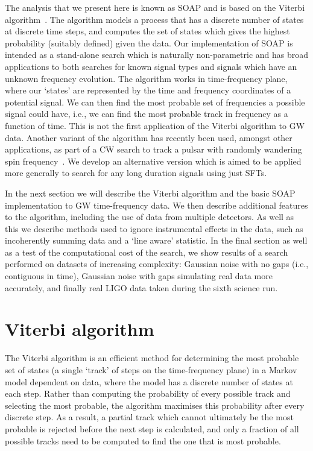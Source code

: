%
%
The analysis that we present here is known as SOAP \citep{ellis2006SnakesPlanea} and is based on the Viterbi algorithm~\citep{viterbi1967ErrorBounds}. The algorithm models a process that has a discrete number of states at discrete time steps, and computes the set of states which gives the highest probability (suitably defined) given the data. Our implementation of SOAP is intended as a stand-alone search which is naturally non-parametric and has broad applications to both searches for known signal types and signals which have an unknown frequency evolution. The algorithm works in time-frequency plane, where our `states' are represented by the time and frequency coordinates of a potential signal. We can then find the most probable set of frequencies a possible signal could have, i.e., we can find the most probable track in frequency as a function of time. This is not the first application of the Viterbi algorithm to \gls{GW} data. Another variant of the algorithm \citep{suvorova2016HiddenMarkova} has recently been used, amongst other applications, as part of a \gls{CW} search to track a pulsar with randomly wandering spin frequency~\citep{sun2018HiddenMarkov, suvorova2017HiddenMarkov,abbott2017SearchGravitational, abbott2018SearchGravitational, sun2018ApplicationHidden}. We develop an alternative version which is aimed to be applied more generally to search for any long duration signals using just \glspl{SFT}.

%
%
In the next section we will describe the Viterbi algorithm and the basic SOAP implementation to \gls{GW} time-frequency data. We then describe additional features to the algorithm, including the use of data from multiple detectors. As well as this we describe methods used to ignore instrumental effects in the data, such as incoherently summing data and a `line aware' statistic. In the final section as well as a test of the computational cost of the search, we show results of a search performed on datasets of increasing complexity: Gaussian noise with no gaps (i.e., contiguous in time), Gaussian noise with gaps simulating real data more accurately, and finally real \gls{LIGO} data taken during the sixth science run. 


\section{\label{soap:viterbi}Viterbi algorithm}
%
%
The Viterbi algorithm is an efficient method for determining the most probable set of states (a single `track' of steps on the time-frequency plane) in a Markov model dependent on data, where the model has a discrete number of states at each step. Rather than computing the probability of every possible track and selecting the most probable, the algorithm maximises this probability after every discrete step. As a result, a partial track which cannot ultimately be the most probable is rejected before the next step is calculated, and only a fraction of all possible tracks need to be computed to find the one that is most probable.

